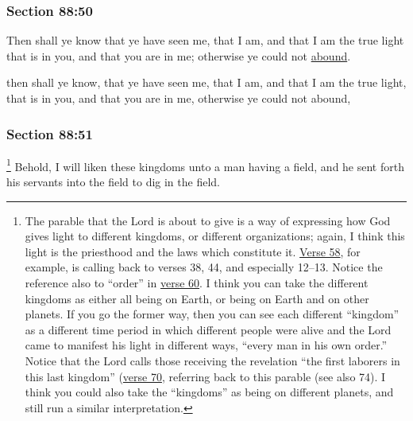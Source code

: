 	\subsubsection{Section 88:50} %
		\label{DC88-50}

		Then shall ye know that ye have seen me, that I am, and that I am the true light that is in you, and that you are in me; otherwise ye could not \hyperref[ABOUND]{abound}.

		\begin{framed}
		\scriptsize
			\begin{compactdesc}
				\item[JSP] then shall ye know, that ye have seen me, that I am, and that I am the true light, that is in you, and that you are in me, otherwise ye could not abound,
			\end{compactdesc}
		\end{framed}

	\subsubsection{Section 88:51} %
		\label{DC88-51}

			\footnote{%
				The parable that the Lord is about to give is a way of expressing how God gives light to different kingdoms, or different organizations; again, I think this light is the priesthood and the laws which constitute it. \hyperref[DC88-48]{Verse 58}, for example, is calling back to verses 38, 44, and especially 12--13. Notice the reference also to ``order'' in \hyperref[DC88-60]{verse 60}. I think you can take the different kingdoms as either all being on Earth, or being on Earth and on other planets. If you go the former way, then you can see each different ``kingdom'' as a different time period in which different people were alive and the Lord came to manifest his light in different ways, ``every man in his own order.'' Notice that the Lord calls those receiving the revelation ``the first laborers in this last kingdom'' (\hyperref[DC88-70]{verse 70}, referring back to this parable (see also 74). I think you could also take the ``kingdoms'' as being on different planets, and still run a similar interpretation.
				}%
		Behold, I will liken these kingdoms unto a man having a field, and he sent forth his servants into the field to dig in the field.

